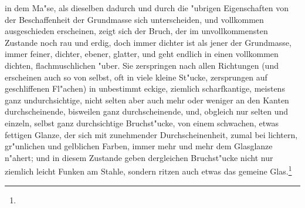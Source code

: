 \documentclass[a4paper, 11pt, oneside, german]{article}
\begin{document}
in dem Ma"se, als dieselben dadurch und durch die "ubrigen Eigenschaften von der Beschaffenheit der Grundmasse sich unterscheiden, und vollkommen ausgeschieden erscheinen, zeigt sich der Bruch, der im unvollkommensten Zustande noch rau und erdig, doch immer dichter ist als jener der Grundmasse, immer feiner, dichter, ebener, glatter, und geht endlich in einen vollkommen dichten, flachmuschlichen "uber. Sie zerspringen nach allen Richtungen (und erscheinen auch so von selbst, oft in viele kleine St"ucke, zersprungen auf geschliffenen Fl"achen) in unbestimmt eckige, ziemlich scharfkantige, meistens ganz undurchsichtige, nicht selten aber auch mehr oder weniger an den Kanten durchscheinende, bisweilen ganz durchscheinende, und, obgleich nur selten und einzeln, selbst ganz durchsichtige Bruchst"ucke, von einem schwachen, etwas fettigen Glanze, der sich mit zunehmender Durchscheinenheit, zumal bei lichtern, gr"unlichen und gelblichen Farben, immer mehr und mehr dem Glasglanze n"ahert; und in diesem Zustande geben dergleichen Bruchst"ucke nicht nur ziemlich leicht Funken am Stahle, sondern ritzen auch etwas das gemeine Glas.\footnote{}
\end{document}
